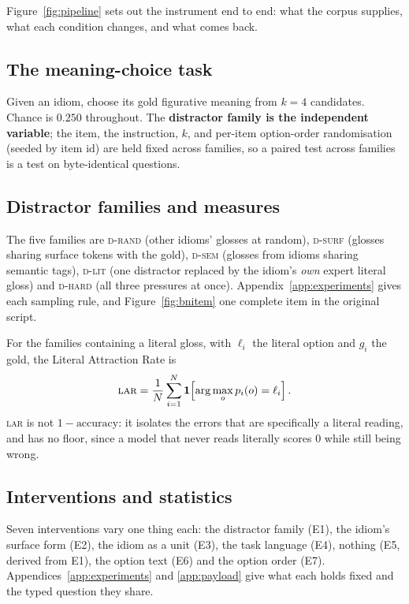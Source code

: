\documentclass[11pt]{article}
\newcommand{\Drand}{\textsc{d-rand}}
\newcommand{\Dsurf}{\textsc{d-surf}}
\newcommand{\Dsem}{\textsc{d-sem}}
\newcommand{\Dlit}{\textsc{d-lit}}
\newcommand{\Dhard}{\textsc{d-hard}}
\newcommand{\LAR}{\textsc{lar}}
\begin{document}
Figure~\ref{fig:pipeline} sets out the instrument end to end: what the corpus
supplies, what each condition changes, and what comes back.

\subsection{The meaning-choice task}

Given an idiom, choose its gold figurative meaning from $k=4$
candidates. Chance is $0.250$ throughout. The \textbf{distractor family is the
independent variable}; the item, the instruction, $k$, and per-item option-order
randomisation (seeded by item id) are held fixed across families, so a paired
test across families is a test on byte-identical questions.

\subsection{Distractor families and measures}

The five families are \Drand{} (other idioms' glosses at random), \Dsurf{}
(glosses sharing surface tokens with the gold), \Dsem{} (glosses from idioms
sharing semantic tags), \Dlit{} (one distractor replaced by the idiom's
\emph{own} expert literal gloss) and \Dhard{} (all three pressures at once).
Appendix~\ref{app:experiments} gives each sampling rule, and
Figure~\ref{fig:bnitem} one complete item in the original script.

For the families containing a literal gloss, with $\ell_i$ the literal option
and $g_i$ the gold, the Literal Attraction Rate is
\[
\LAR = \frac{1}{N}\sum_{i=1}^{N} \mathbf{1}\!\left[\arg\max_o p_i(o) = \ell_i\right].
\]
\LAR{} is not $1-\text{accuracy}$: it isolates the errors that are specifically
a literal reading, and has no floor, since a model that never reads literally
scores $0$ while still being wrong.

\subsection{Interventions and statistics}

Seven interventions vary one thing each: the distractor family (E1), the
idiom's surface form (E2), the idiom as a unit (E3), the task language (E4),
nothing (E5, derived from E1), the option text (E6) and the option order (E7).
Appendices~\ref{app:experiments} and \ref{app:payload} give what each holds
fixed and the typed question they share.
\end{document}

